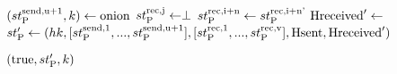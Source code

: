 \begin{minipage}{\linewidth}
{\begin{algorithmic}[1]
    \State $(st_\text{P}^\text{send,u+1},k) \gets \text{onion}$
    \State $st_\text{P}^\text{rec,j} \gets \perp$
    \EndFor
    \State $st_\text{P}^\text{rec,i+n} \gets st_\text{P}^\text{rec,i+n'}$
    \State $\text{Hreceived}' \gets$ 
    \State $st_\text{P}' \gets (hk,[st_\text{P}^\text{send,1},...,st_\text{P}^\text{send,u+1}],
                 [st_\text{P}^\text{rec,1},...,st_\text{P}^\text{rec,v}], \text{Hsent}, \text{Hreceived}')$

    \State \Return $(\text{true}, st_\text{P}',k)$
    \EndProcedure
  \end{algorithmic}
  }
\end{minipage}
